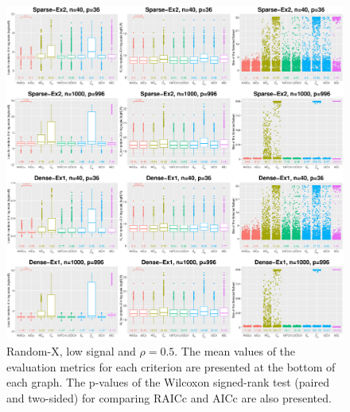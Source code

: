 \begin{figure}[!ht]
  \centering
  \includegraphics[width=\textwidth]{figures/main/randomx/subset_selection/largep_lsnr.eps}
  \caption{Random-X, low signal and $\rho=0.5$. The mean values of the evaluation metrics for each criterion are presented at the bottom of each graph. The p-values of the Wilcoxon signed-rank test (paired and two-sided) for comparing RAICc and AICc are also presented.}
  \label{fig:subsetselection_randomx_lsnr_largep}
\end{figure}

